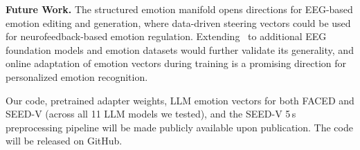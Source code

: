 \noindent\textbf{Future Work.} The structured emotion manifold opens directions for EEG-based emotion editing and generation, where data-driven steering vectors could be used for neurofeedback-based emotion regulation. Extending \ours\ to additional EEG foundation models and emotion datasets would further validate its generality, and online adaptation of emotion vectors during training is a promising direction for personalized emotion recognition.

Our code, pretrained adapter weights, LLM emotion vectors for both FACED and SEED-V (across all 11 LLM models we tested), and the SEED-V 5\,s preprocessing pipeline will be made publicly available upon publication. The code will be released on GitHub.
